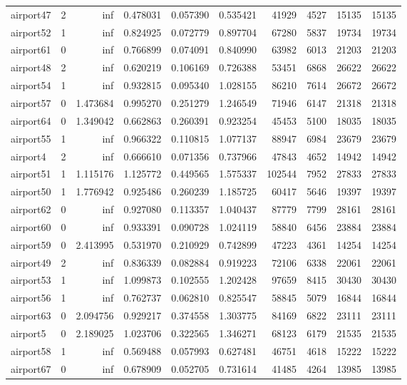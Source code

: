 \begin{longtable}{|l|r|r|r|r|r|r|r|r|r|}
airport47 & 2 & inf & 0.478031 & 0.057390 & 0.535421 & 41929 & 4527 & 15135 & 15135 \\
airport52 & 1 & inf & 0.824925 & 0.072779 & 0.897704 & 67280 & 5837 & 19734 & 19734 \\
airport61 & 0 & inf & 0.766899 & 0.074091 & 0.840990 & 63982 & 6013 & 21203 & 21203 \\
airport48 & 2 & inf & 0.620219 & 0.106169 & 0.726388 & 53451 & 6868 & 26622 & 26622 \\
airport54 & 1 & inf & 0.932815 & 0.095340 & 1.028155 & 86210 & 7614 & 26672 & 26672 \\
airport57 & 0 & 1.473684 & 0.995270 & 0.251279 & 1.246549 & 71946 & 6147 & 21318 & 21318 \\
airport64 & 0 & 1.349042 & 0.662863 & 0.260391 & 0.923254 & 45453 & 5100 & 18035 & 18035 \\
airport55 & 1 & inf & 0.966322 & 0.110815 & 1.077137 & 88947 & 6984 & 23679 & 23679 \\
airport4 & 2 & inf & 0.666610 & 0.071356 & 0.737966 & 47843 & 4652 & 14942 & 14942 \\
airport51 & 1 & 1.115176 & 1.125772 & 0.449565 & 1.575337 & 102544 & 7952 & 27833 & 27833 \\
airport50 & 1 & 1.776942 & 0.925486 & 0.260239 & 1.185725 & 60417 & 5646 & 19397 & 19397 \\
airport62 & 0 & inf & 0.927080 & 0.113357 & 1.040437 & 87779 & 7799 & 28161 & 28161 \\
airport60 & 0 & inf & 0.933391 & 0.090728 & 1.024119 & 58840 & 6456 & 23884 & 23884 \\
airport59 & 0 & 2.413995 & 0.531970 & 0.210929 & 0.742899 & 47223 & 4361 & 14254 & 14254 \\
airport49 & 2 & inf & 0.836339 & 0.082884 & 0.919223 & 72106 & 6338 & 22061 & 22061 \\
airport53 & 1 & inf & 1.099873 & 0.102555 & 1.202428 & 97659 & 8415 & 30430 & 30430 \\
airport56 & 1 & inf & 0.762737 & 0.062810 & 0.825547 & 58845 & 5079 & 16844 & 16844 \\
airport63 & 0 & 2.094756 & 0.929217 & 0.374558 & 1.303775 & 84169 & 6822 & 23111 & 23111 \\
airport5 & 0 & 2.189025 & 1.023706 & 0.322565 & 1.346271 & 68123 & 6179 & 21535 & 21535 \\
airport58 & 1 & inf & 0.569488 & 0.057993 & 0.627481 & 46751 & 4618 & 15222 & 15222 \\
airport67 & 0 & inf & 0.678909 & 0.052705 & 0.731614 & 41485 & 4264 & 13985 & 13985 \\

\end{longtable}
